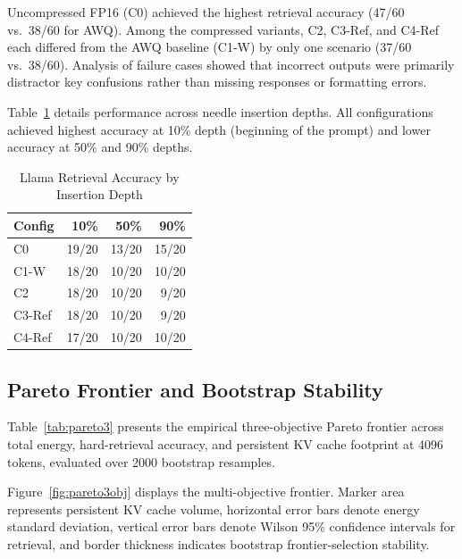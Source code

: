 \documentclass[sigconf,nonacm]{acmart}
\begin{document}
\begingroup\raggedright
Uncompressed FP16 (C0) achieved the highest retrieval accuracy (47/60 vs.\ 38/60 for AWQ). Among the compressed variants, C2, C3-Ref, and C4-Ref each differed from the AWQ baseline (C1-W) by only one scenario (37/60 vs.\ 38/60). Analysis of failure cases showed that incorrect outputs were primarily distractor key confusions rather than missing responses or formatting errors.
\par\endgroup

Table~\ref{tab:depth} details performance across needle insertion depths. All configurations achieved highest accuracy at 10\% depth (beginning of the prompt) and lower accuracy at 50\% and 90\% depths.

\begin{table}[htbp]
\caption{Llama Retrieval Accuracy by Insertion Depth}
\label{tab:depth}
\centering\small
\begin{tabular}{lrrr}
\toprule
\textbf{Config} & \textbf{10\%} & \textbf{50\%} & \textbf{90\%} \\
\midrule
C0     & 19/20 & 13/20 & 15/20 \\
C1-W   & 18/20 & 10/20 & 10/20 \\
C2     & 18/20 & 10/20 &  9/20 \\
C3-Ref & 18/20 & 10/20 &  9/20 \\
C4-Ref & 17/20 & 10/20 & 10/20 \\
\bottomrule
\end{tabular}
\end{table}

\subsection{Pareto Frontier and Bootstrap Stability}

Table~\ref{tab:pareto3} presents the empirical three-objective Pareto frontier across total energy, hard-retrieval accuracy, and persistent KV cache footprint at 4096 tokens, evaluated over 2000 bootstrap resamples.

Figure~\ref{fig:pareto3obj} displays the multi-objective frontier. Marker area represents persistent KV cache volume, horizontal error bars denote energy standard deviation, vertical error bars denote Wilson 95\% confidence intervals for retrieval, and border thickness indicates bootstrap frontier-selection stability.
\end{document}
